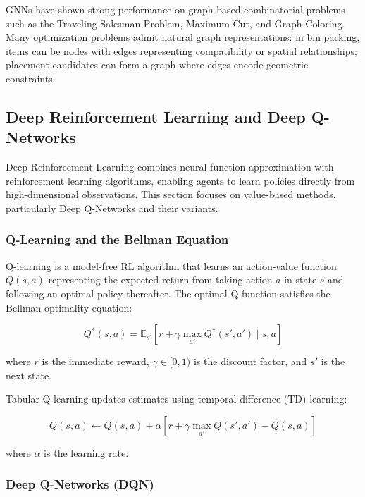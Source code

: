 GNNs have shown strong performance on graph-based combinatorial problems such as the Traveling Salesman Problem, Maximum Cut, and Graph Coloring. Many optimization problems admit natural graph representations: in bin packing, items can be nodes with edges representing compatibility or spatial relationships; placement candidates can form a graph where edges encode geometric constraints.

\subsection{Deep Reinforcement Learning and Deep Q-Networks}

Deep Reinforcement Learning combines neural function approximation with reinforcement learning algorithms, enabling agents to learn policies directly from high-dimensional observations. This section focuses on value-based methods, particularly Deep Q-Networks and their variants.

\subsubsection{Q-Learning and the Bellman Equation}

Q-learning is a model-free RL algorithm that learns an action-value function $Q(s,a)$ representing the expected return from taking action $a$ in state $s$ and following an optimal policy thereafter. The optimal Q-function satisfies the Bellman optimality equation:

\begin{equation}
Q^*(s,a) = \mathbb{E}_{s'}\left[r + \gamma \max_{a'} Q^*(s', a') \mid s, a\right]
\end{equation}

where $r$ is the immediate reward, $\gamma \in [0,1)$ is the discount factor, and $s'$ is the next state.

Tabular Q-learning updates estimates using temporal-difference (TD) learning:

\begin{equation}
Q(s,a) \leftarrow Q(s,a) + \alpha \left[r + \gamma \max_{a'} Q(s',a') - Q(s,a)\right]
\end{equation}

where $\alpha$ is the learning rate.

\subsubsection{Deep Q-Networks (DQN)}

